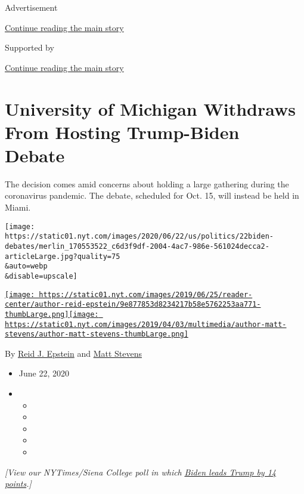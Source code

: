 Advertisement

\protect\hyperlink{after-top}{Continue reading the main story}

Supported by

\protect\hyperlink{after-sponsor}{Continue reading the main story}

\hypertarget{university-of-michigan-withdraws-from-hosting-trump-biden-debate}{%
\section{University of Michigan Withdraws From Hosting Trump-Biden
Debate}\label{university-of-michigan-withdraws-from-hosting-trump-biden-debate}}

The decision comes amid concerns about holding a large gathering during
the coronavirus pandemic. The debate, scheduled for Oct. 15, will
instead be held in Miami.

\texttt{[image: https://static01.nyt.com/images/2020/06/22/us/politics/22biden-debates/merlin\_170553522\_c6d3f9df-2004-4ac7-986e-561024decca2-articleLarge.jpg?quality=75\\\&auto=webp\\\&disable=upscale]}

\href{https://www.nytimes.com/by/reid-j-epstein}{\texttt{[image: https://static01.nyt.com/images/2019/06/25/reader-center/author-reid-epstein/9e877853d8234217b58e5762253aa771-thumbLarge.png]}}\href{https://www.nytimes.com/by/matt-stevens}{\texttt{[image: https://static01.nyt.com/images/2019/04/03/multimedia/author-matt-stevens/author-matt-stevens-thumbLarge.png]}}

By \href{https://www.nytimes.com/by/reid-j-epstein}{Reid J. Epstein} and
\href{https://www.nytimes.com/by/matt-stevens}{Matt Stevens}

\begin{itemize}
\item
  June 22, 2020
\item
  \begin{itemize}
  \item
  \item
  \item
  \item
  \item
  \end{itemize}
\end{itemize}

\emph{{[}View our NYTimes/Siena College poll in which}
\href{https://www.nytimes.com/2020/06/24/us/politics/trump-biden-poll-nyt-upshot-siena-college.html}{\emph{Biden
leads Trump by 14 points}}\emph{.{]}}

